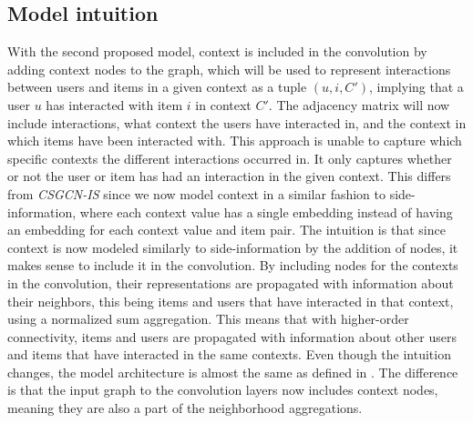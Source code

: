\subsection{Model intuition}\label{subsec:csgcn_adj_intuition}
With the second proposed model, context is included in the convolution by adding context nodes to the graph, which will be used to represent interactions between users and items in a given context as a tuple $(u,i,C')$, implying that a user $u$ has interacted with item $i$ in context $C'$.
The adjacency matrix will now include interactions, what context the users have interacted in, and the context in which items have been interacted with.
This approach is unable to capture which specific contexts the different interactions occurred in.
It only captures whether or not the user or item has had an interaction in the given context.
This differs from \textit{CSGCN-IS} since we now model context in a similar fashion to side-information, where each context value has a single embedding instead of having an embedding for each context value and item pair.
The intuition is that since context is now modeled similarly to side-information by the addition of nodes, it makes sense to include it in the convolution.
By including nodes for the contexts in the convolution, their representations are propagated with information about their neighbors, this being items and users that have interacted in that context, using a normalized sum aggregation.
This means that with higher-order connectivity, items and users are propagated with information about other users and items that have interacted in the same contexts.
Even though the intuition changes, the model architecture is almost the same as defined in .
The difference is that the input graph to the convolution layers now includes context nodes, meaning they are also a part of the neighborhood aggregations.

